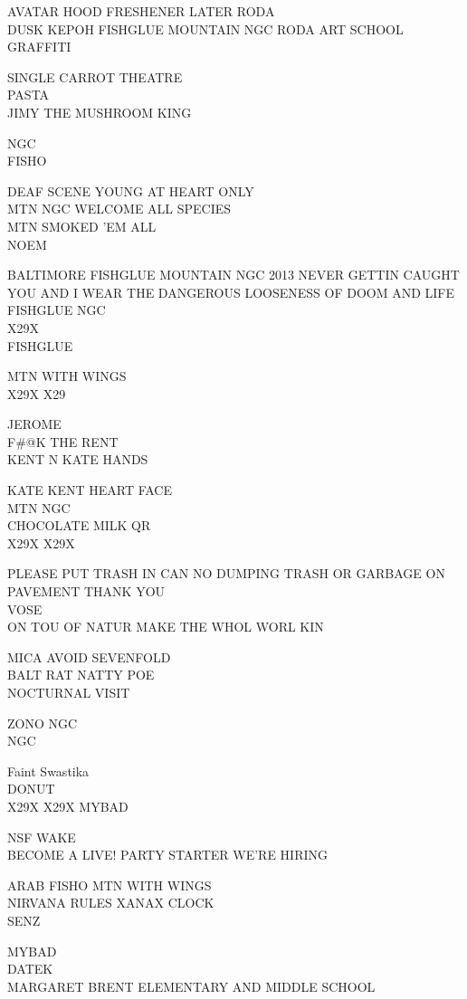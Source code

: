 \documentclass[10pt,letterpaper]{article}
\begin{document}
AVATAR HOOD FRESHENER LATER RODA\\
DUSK KEPOH FISHGLUE MOUNTAIN NGC RODA ART SCHOOL GRAFFITI

SINGLE CARROT THEATRE\\
PASTA\\
JIMY THE MUSHROOM KING

NGC\\
FISHO

DEAF SCENE YOUNG AT HEART ONLY\\
MTN NGC WELCOME ALL SPECIES\\
MTN SMOKED 'EM ALL\\
NOEM

BALTIMORE FISHGLUE MOUNTAIN NGC 2013 NEVER GETTIN CAUGHT\\
YOU AND I WEAR THE DANGEROUS LOOSENESS OF DOOM AND LIFE FISHGLUE NGC\\
X29X\\
FISHGLUE

MTN WITH WINGS\\
X29X X29

JEROME\\
F\#@K THE RENT\\
KENT N KATE HANDS

KATE KENT HEART FACE\\
MTN NGC\\
CHOCOLATE MILK QR\\
X29X X29X

PLEASE PUT TRASH IN CAN NO DUMPING TRASH OR GARBAGE ON PAVEMENT THANK YOU\\
VOSE\\
ON TOU OF NATUR MAKE THE WHOL WORL KIN

MICA AVOID SEVENFOLD\\
BALT RAT NATTY POE\\
NOCTURNAL VISIT

ZONO NGC\\
NGC

Faint Swastika\\
DONUT\\
X29X X29X MYBAD

NSF WAKE\\
BECOME A LIVE! PARTY STARTER WE'RE HIRING

ARAB FISHO MTN WITH WINGS\\
NIRVANA RULES XANAX CLOCK\\
SENZ

MYBAD\\
DATEK\\
MARGARET BRENT ELEMENTARY AND MIDDLE SCHOOL
\end{document}
